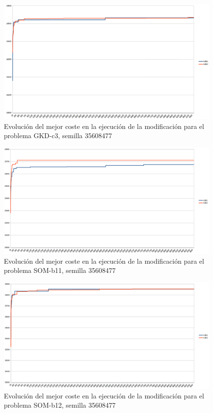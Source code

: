 	\begin{figure}[H]
		\centering
		\includegraphics[scale=0.3]{img/convergenciaGKD3mejora.png}
		\caption{Evolución del mejor coste en la ejecución de la modificación para el problema GKD-c3, semilla 35608477}
		\label{gkd-c3_convergencia_mejora}
	\end{figure}

	\begin{figure}[H]
		\centering
		\includegraphics[scale=0.3]{img/convergenciaSOM1mejora.png}
		\caption{Evolución del mejor coste en la ejecución de la modificación para el problema SOM-b11, semilla 35608477}
		\label{SOM-b_11_convergencia_mejora}
	\end{figure}

	\begin{figure}[H]
		\centering
		\includegraphics[scale=0.3]{img/convergenciaSOM2mejora.png}
		\caption{Evolución del mejor coste en la ejecución de la modificación para el problema SOM-b12, semilla 35608477}
		\label{SOM-b_12_convergencia_mejora}
	\end{figure}

